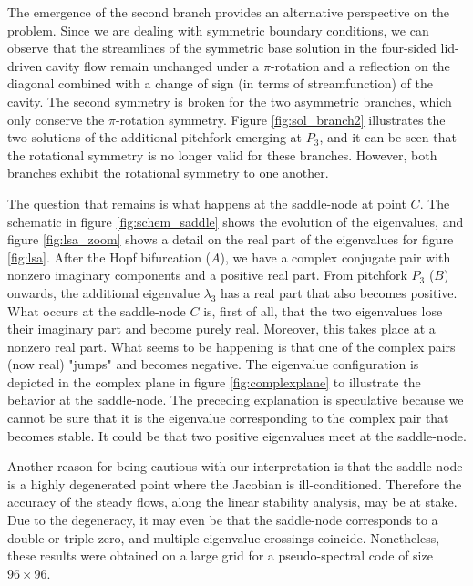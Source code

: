 The emergence of the second branch provides an alternative perspective on the
problem. Since we are dealing with symmetric boundary conditions, we can
observe that the streamlines of the symmetric base solution in the four-sided
lid-driven cavity flow remain unchanged under a $\pi$-rotation and a
reflection on the diagonal combined with a change of sign (in terms of
streamfunction) of the cavity. The second symmetry is broken for the two
asymmetric branches, which only conserve the $\pi$-rotation symmetry. Figure
\ref{fig:sol_branch2} illustrates the two solutions of the additional pitchfork
emerging at $P_3$, and it can be seen that the rotational symmetry is no
longer valid for these branches. However, both branches exhibit the rotational
symmetry to one another.

The question that remains is what happens at the saddle-node at point $C$. The
schematic in figure \ref{fig:schem_saddle} shows the evolution of the
eigenvalues, and figure \ref{fig:lsa_zoom} shows a detail on the real part of
the eigenvalues for figure \ref{fig:lsa}. After the Hopf bifurcation ($A$), we
have a complex conjugate pair with nonzero imaginary components and a positive
real part. From pitchfork $P_3$ ($B$) onwards, the additional eigenvalue
$\lambda_3$ has a real part that also becomes positive. What occurs at the
saddle-node $C$ is, first of all, that the two eigenvalues lose their imaginary
part and become purely real. Moreover, this takes place at a nonzero real part.
What seems to be happening is that one of the complex pairs (now real) "jumps"
and becomes negative. The eigenvalue configuration is depicted in the complex
plane in figure \ref{fig:complexplane} to illustrate the behavior at the
saddle-node. The preceding explanation is speculative because we cannot be sure
that it is the eigenvalue corresponding to the complex pair that becomes
stable. It could be that two positive eigenvalues meet at the saddle-node.

Another reason for being cautious with our interpretation is that the
saddle-node is a highly degenerated point where the Jacobian is
ill-conditioned. Therefore the accuracy of the steady flows, along the linear
stability analysis, may be at stake. Due to the degeneracy, it may even be that
the saddle-node corresponds to a double or triple zero, and multiple eigenvalue
crossings coincide. Nonetheless, these results were obtained on a large grid
for a pseudo-spectral code of size $96 \times 96$.

